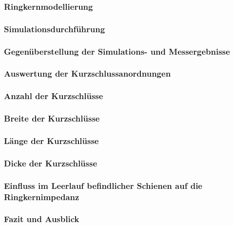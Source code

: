 \documentclass[accentcolor=tud9b, colorbacktitle, inverttitle]{tudbeamer}
\begin{document}
\begin{frame}\frametitle{Ringkernmodellierung}

\end{frame}



\begin{frame}\frametitle{Simulationsdurchf\"uhrung}

\end{frame}



\begin{frame}\frametitle{Gegen\"uberstellung der Simulations- und Messergebnisse}

\end{frame}



\begin{frame}\frametitle{Auswertung der Kurzschlussanordnungen}

\end{frame}



\begin{frame}\frametitle{Anzahl der Kurzschl\"usse}

\end{frame}



\begin{frame}\frametitle{Breite der Kurzschlüsse}

\end{frame}


\begin{frame}\frametitle{Länge der Kurzschlüsse}

\end{frame}


\begin{frame}\frametitle{Dicke der Kurzschlüsse}

\end{frame}




\begin{frame}\frametitle{Einfluss im Leerlauf befindlicher Schienen auf die Ringkernimpedanz}

\end{frame}



\begin{frame}\frametitle{Fazit und Ausblick}

\end{frame}

% 	 
\end{document}

